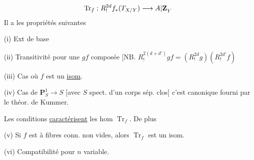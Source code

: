 \[
\operatorname{Tr}_f:R^{2d}_!f_{\relax{*}}(T_{X/Y})\longrightarrow\relax{A|\mathbf Z}_Y
\]
Il a les propriétés suivantes

(i) Ext de base

(ii) Transitivité pour une   $gf$ composée [NB. $R^{2(d+d')}_!gf=(R^{2d}_!g)(R^{2d'}_!f)$

(iii) Cas où $f$ est un \uline{isom}.

(iv)  Cas de $\mathbf P^1_S\longrightarrow S$
[avec $S$ spect. d'un corps sép. clos] c'est   canonique fourni par le théor. de Kummer.

Les conditions \uline{caractérisent} les hom $\operatorname{Tr}_f$. De plus

(v) Si $f$ est à fibres conn. non vides, alors $\operatorname{Tr}_f$ est un isom.

(vi) Compatibilité pour $n$ variable.

